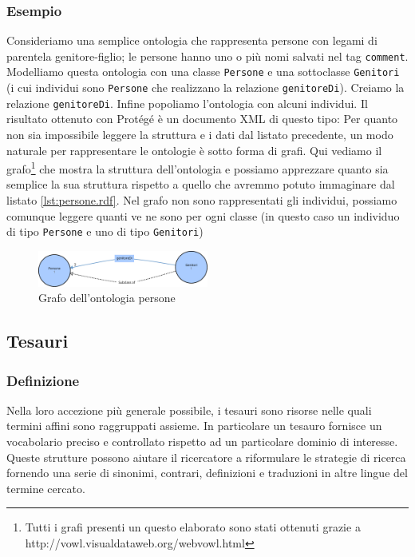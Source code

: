 \subsubsection{Esempio}
Consideriamo una semplice ontologia che rappresenta persone con legami di parentela genitore-figlio; le persone hanno uno o più nomi salvati nel tag \verb|comment|. Modelliamo questa ontologia con una classe \verb|Persone| e una sottoclasse \verb|Genitori| (i cui individui sono \verb|Persone| che realizzano la relazione \verb|genitoreDi|). Creiamo la relazione \verb|genitoreDi|. Infine popoliamo l'ontologia con alcuni individui. Il risultato ottenuto con Protégé è un documento XML di questo tipo:
Per quanto non sia impossibile leggere la struttura e i dati dal listato precedente, un modo naturale per rappresentare le ontologie è sotto forma di grafi. Qui vediamo il grafo\footnote{Tutti i grafi presenti un questo elaborato sono stati ottenuti grazie a http://vowl.visualdataweb.org/webvowl.html} che mostra la struttura dell'ontologia e possiamo apprezzare quanto sia semplice la sua struttura rispetto a quello che avremmo potuto immaginare dal listato \ref{lst:persone.rdf}. Nel grafo non sono rappresentati gli individui, possiamo comunque leggere quanti ve ne sono per ogni classe (in questo caso un individuo di tipo \verb|Persone| e uno di tipo \verb|Genitori|)
\begin{figure}[H]
	\centering
	\includegraphics[width=0.5\textwidth]{Picture/persone.rdf.pdf}
	\caption{Grafo dell'ontologia persone}
\end{figure}


\subsection{Tesauri}
\subsubsection{Definizione}
Nella loro accezione più generale possibile, i tesauri sono risorse nelle quali termini affini sono raggruppati assieme\cite{kilgarriff2000s}. In particolare un tesauro fornisce un vocabolario preciso e controllato rispetto ad un particolare dominio di interesse.\cite{srinivasan1992thesaurus} Queste strutture possono aiutare il ricercatore a riformulare le strategie di ricerca fornendo una serie di sinonimi, contrari, definizioni e traduzioni in altre lingue del termine cercato.

